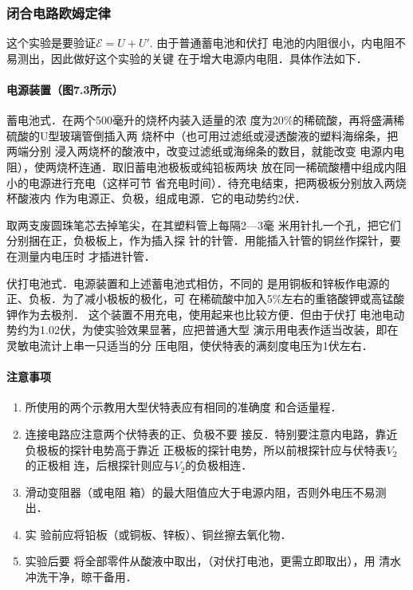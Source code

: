 \subsubsection{闭合电路欧姆定律}
这个实验是要验证$\mathcal{E}=U+U'$. 由于普通蓄电池和伏打
电池的内阻很小，内电阻不易测出，因此做好这个实验的关键
在于增大电源内电阻．具体作法如下．

\paragraph{电源装置（图7.3所示）}

蓄电池式．在两个500毫升的烧杯内装入适量的浓
度为20\%的稀硫酸，再将盛满稀硫酸的U型玻璃管倒插入两
烧杯中（也可用过滤纸或浸透酸液的塑料海绵条，把两端分别
浸入两烧杯的酸液中，改变过滤纸或海绵条的数目，就能改变
电源内电阻），使两烧杯连通．取旧蓄电池极板或纯铅板两块
放在同一稀硫酸槽中组成内阻小的电源进行充电（这样可节
省充电时间）．待充电结束，把两极板分别放入两烧杯酸液内
作为电源正、负极，组成电源．它的电动势约2伏．

取两支废圆珠笔芯去掉笔尖，在其塑料管上每隔2—3毫
米用针扎一个孔，把它们分别捆在正，负极板上，作为插入探
针的针管．用能插入针管的铜丝作探针，要在测量内电压时
才插进针管．

伏打电池式．电源装置和上述蓄电池式相仿，不同的
是用铜板和锌板作电源的正、负板．为了减小极板的极化，可
在稀硫酸中加入5\%左右的重铬酸钾或高锰酸钾作为去极剂．
这个装置不用充电，使用起来也比较方便．但由于伏打
电池电动势约为1.02伏，为使实验效果显著，应把普通大型
演示用电表作适当改装，即在灵敏电流计上串一只适当的分
压电阻，使伏特表的满刻度电压为1伏左右．

\paragraph{注意事项}
\begin{enumerate}
    \item 所使用的两个示教用大型伏特表应有相同的准确度
和合适量程．
\item 连接电路应注意两个伏特表的正、负极不要
接反．特别要注意内电路，靠近负极板的探针电势高于靠近
正极板的探针电势，所以前根探针应与伏特表$V_2$的正极相
连，后根探针则应与$V_2$的负极相连．
\item 滑动变阻器（或电阻
箱）的最大阻值应大于电源内阻，否则外电压不易测出．
\item 实
验前应将铅板（或铜板、锌板）、铜丝擦去氧化物．
\item 实验后要
将全部零件从酸液中取出，（对伏打电池，更需立即取出），用
清水冲洗干净，晾干备用．
\end{enumerate}

